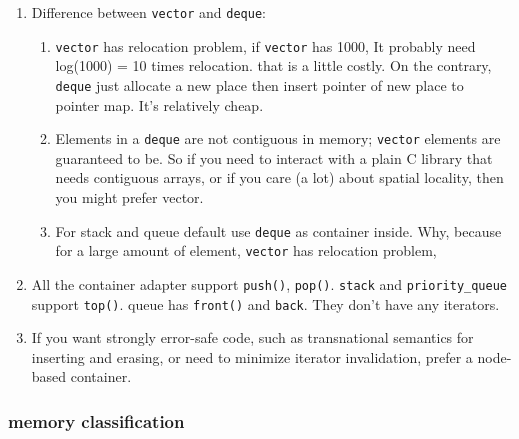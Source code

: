 \documentclass[a4paper,11pt,twoside]{book}
\begin{document}
\begin{itemize}
\begin{enumerate}
\item Difference between \texttt{vector} and \texttt{deque}:
\begin{enumerate}
\item \texttt{vector} has relocation problem, if \texttt{vector} has 1000, It probably need log(1000) = 10 times relocation. that is a little costly. On the contrary, \texttt{deque} just allocate a new place then insert pointer of new place to pointer map. It's relatively cheap.


\item Elements in a \texttt{deque} are not contiguous in memory; \texttt{vector} elements are guaranteed to be. So if you need to interact with a plain C library that needs contiguous arrays, or if you care (a lot) about spatial locality, then you might prefer vector.

\item For stack and queue default use \texttt{deque} as container inside. Why, because for a large amount of element, \texttt{vector} has relocation problem,
\end{enumerate}


\item All the container adapter support \texttt{push()}, \texttt{pop()}. \texttt{stack} and \texttt{priority\_queue} support \texttt{top()}. queue has \texttt{front()} and \texttt{back}. They don't have any iterators.

\item If you want strongly error-safe code, such as transnational semantics for inserting and erasing, or need to minimize iterator invalidation, prefer a node-based container.



\end{enumerate}

\end{itemize}


\subsubsection{memory classification}
\end{document}
